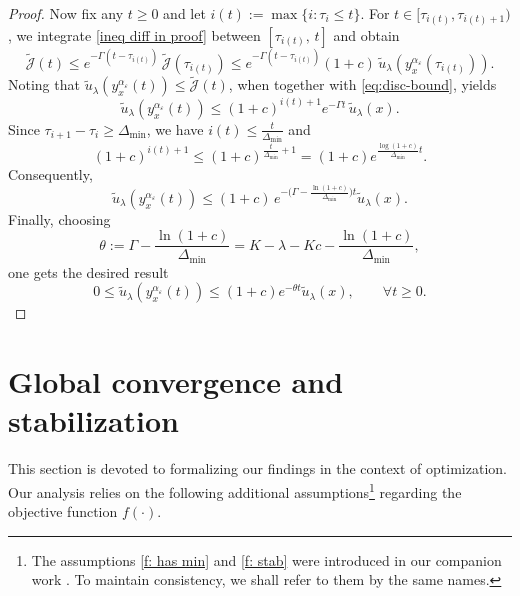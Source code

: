 \documentclass[12pt]{amsart}
\numberwithin{equation}{section}
\theoremstyle{plain}
\begin{document}
\begin{proof}
Now fix any $t\ge0$ and let $i(t):=\max\{i:\tau_i\le t\}$. 
For $t\in[\tau_{i(t)},\tau_{i(t)+1})$, 
we integrate \eqref{ineq diff in proof} between $[\tau_{i(t)},\,t]$ and obtain
\begin{equation*}
\widetilde{\mathscr{J}}(t)
   \le e^{-\Gamma(t-\tau_{i(t)})}\,\widetilde{\mathscr{J}}(\tau_{i(t)})
   \le e^{-\Gamma(t-\tau_{i(t)})}(1+c)\,\tilde u_\lambda(y_{x}^{\alpha_{\varepsilon}}(\tau_{i(t)})).
\end{equation*}
Noting that $\tilde u_\lambda(y_{x}^{\alpha_{\varepsilon}}(t))\le\widetilde{\mathscr{J}}(t)$, when together with
\eqref{eq:disc-bound}, yields
\begin{equation*}
\tilde u_\lambda(y_{x}^{\alpha_{\varepsilon}}(t))
   \le (1+c)^{i(t)+1} e^{-\Gamma t}\,\tilde u_\lambda(x).
\end{equation*}
Since $\tau_{i+1}-\tau_i \geq \Delta_{\min }$, we have  $
i(t)\leq \frac{t}{\Delta_{\min }} $
and
\begin{equation*}
(1+c)^{i(t)+1} \leq(1+c)^{\frac{t}{\Delta_{\min }}+1}=(1+c) e^{\frac{\log (1+c)}{\Delta_{\min }} t} .
\end{equation*}
Consequently,
\begin{equation*}
\tilde u_\lambda(y_{x}^{\alpha_{\varepsilon}}(t))
   \le (1+c)\,e^{-\bigl(\Gamma-\frac{\ln(1+c)}{\Delta_{\min}}\bigr)t}
         \tilde u_\lambda(x).
\end{equation*}
Finally, choosing
\begin{equation*}
\theta :=  \Gamma-\frac{\ln(1+c)}{\Delta_{\min}}=K-\lambda-Kc-\frac{\ln(1+c)}{\Delta_{\min}},
\end{equation*}
one gets the desired result
\begin{equation*}
0\le \tilde u_\lambda(y_{x}^{\alpha_{\varepsilon}}(t))
   \le (1+c)e^{-\theta t}\tilde u_\lambda(x),
   \qquad \forall t\ge0.
\end{equation*}
\end{proof}


\section{Global convergence and stabilization}\label{sec: app opt}


This section is devoted to formalizing our findings in the context of optimization. 
Our analysis relies on the following additional assumptions\footnote{
The assumptions \ref{f: has min} and \ref{f: stab}  were introduced in our companion work  \cite{huang2025control}. To maintain consistency, we shall refer to them by the same names.} regarding the objective function $f(\cdot)$.
\end{document}
